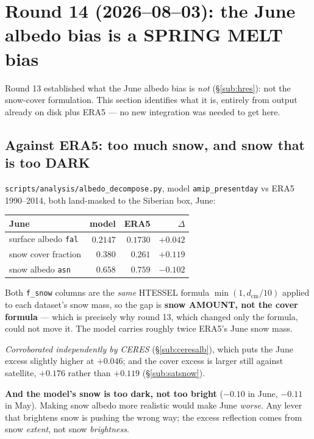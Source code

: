 \documentclass[10pt]{article}
\begin{document}
\section{Round 14 (2026--08--03): the June albedo bias is a SPRING MELT bias}\label{sec:melt}
Round 13 established what the June albedo bias is \emph{not} (\S\ref{sub:hres}): not the
snow-cover formulation. This section identifies what it is, entirely from output already on
disk plus ERA5 --- no new integration was needed to get here.

\subsection{Against ERA5: too much snow, and snow that is too DARK}\label{sub:e5alb}
\texttt{scripts/analysis/albedo\_decompose.py}, model \texttt{amip\_presentday} vs ERA5
1990--2014, both land-masked to the Siberian box, June:

\begin{center}\footnotesize
\begin{tabular}{l r r r}
\toprule
June & model & ERA5 & $\Delta$ \\
\midrule
surface albedo \texttt{fal} & $0.2147$ & $0.1730$ & $\mathbf{+0.042}$ \\
snow cover fraction & $0.380$ & $0.261$ & $\mathbf{+0.119}$ \\
snow albedo \texttt{asn} & $0.658$ & $0.759$ & $\mathbf{-0.102}$ \\
\bottomrule
\end{tabular}
\end{center}

\noindent Both \texttt{f\_snow} columns are the \emph{same} HTESSEL formula
$\min(1, d_{\mathrm{cm}}/10)$ applied to each dataset's snow mass, so the gap is
\textbf{snow AMOUNT, not the cover formula} --- which is precisely why round 13, which
changed only the formula, could not move it. The model carries roughly twice ERA5's June
snow mass.

\emph{Corroborated independently by CERES} (\S\ref{sub:ceresalb}), which puts the June
excess slightly higher at $+0.046$; and the cover excess is larger still against
satellite, $+0.176$ rather than $+0.119$ (\S\ref{sub:satsnow}).

\noindent\textbf{And the model's snow is too dark, not too bright} ($-0.10$ in June,
$-0.11$ in May). Making snow albedo more realistic would make June \emph{worse}. Any lever
that brightens snow is pushing the wrong way; the excess reflection comes from snow
\emph{extent}, not snow \emph{brightness}.
\end{document}
